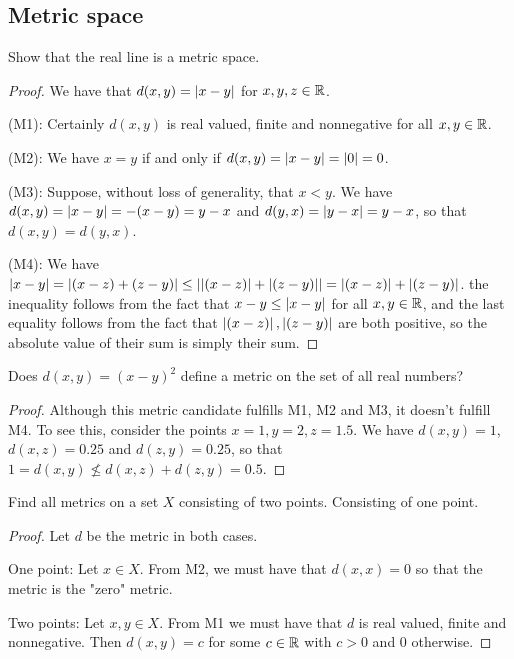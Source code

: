 \subsection{Metric space}


\begin{exercise}{1}
Show that the real line is a metric space.
\end{exercise}
\begin{proof}
We have that $d(x,y)=\left\lvert x-y\right\rvert$ for $x,y,z\in\mathbb{R}$.

(M1): Certainly $d(x,y)$ is real valued, finite and nonnegative for all $x,y\in\mathbb{R}$.

(M2): We have $x=y$ if and only if $d(x,y)=\left\lvert x-y\right\rvert=\left\lvert 0\right\rvert=0$.

(M3): Suppose, without loss of generality, that $x<y$. We have $d(x,y) =\left\lvert x-y\right\rvert =-(x-y) =y-x$ and $d(y,x) =\left\lvert y-x\right\rvert =y-x$, so that $d(x,y)=d(y,x)$.

(M4): We have $\left\lvert x-y\right\rvert =\left\lvert (x-z)+(z-y)\right\rvert\leq \left\lvert \left\lvert (x-z)\right\rvert+\left\lvert (z-y)\right\rvert\right\rvert =\left\lvert (x-z)\right\rvert+\left\lvert (z-y)\right\rvert$. the inequality follows from the fact that $x-y \leq\left\lvert x-y\right\rvert$ for all $x,y\in\mathbb{R}$, and the last equality follows from the fact that $\left\lvert (x-z)\right\rvert, \left\lvert (z-y)\right\rvert$ are both positive, so the absolute value of their sum is simply their sum.
\end{proof}

\begin{exercise}{2}
Does $d(x,y)=(x-y)^2$ define a metric on the set of all real numbers?
\end{exercise}
\begin{proof}
Although this metric candidate fulfills M1, M2 and M3, it doesn't fulfill M4. To see this, consider the points $x=1,y=2,z=1.5$. We have $d(x,y)=1$, $d(x,z)=0.25$ and $d(z,y)=0.25$, so that $1=d(x,y)\not\leq d(x,z)+d(z,y) =0.5$.
\end{proof}

\begin{exercise}{4}
Find all metrics on a set $X$ consisting of two points. Consisting of one point.
\end{exercise}
\begin{proof}
Let $d$ be the metric in both cases.

One point: Let $x\in X$. From M2, we must have that $d(x,x) =0$ so that the metric is the "zero" metric.

Two points: Let $x,y\in X$. From M1 we must have that $d$ is real valued, finite and nonnegative. Then $d(x,y)=c$ for some $c\in\mathbb{R}$ with $c>0$ and 0 otherwise.
\end{proof}


